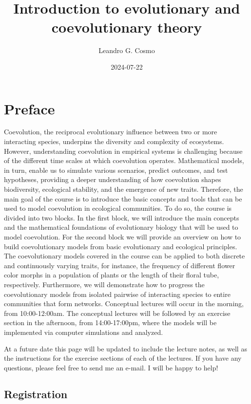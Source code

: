 \documentclass[
]{book}
\title{Introduction to evolutionary and coevolutionary theory}
\author{Leandro G. Cosmo}
\date{2024-07-22}
\begin{document}
\maketitle

{
\setcounter{tocdepth}{1}
\tableofcontents
}
\hypertarget{preface}{%
\chapter{Preface}\label{preface}}

Coevolution, the reciprocal evolutionary influence between two or more interacting species, underpins the diversity and complexity of ecosystems. However, understanding coevolution in empirical systems is challenging because of the different time scales at which coevolution operates. Mathematical models, in turn, enable us to simulate various scenarios, predict outcomes, and test hypotheses, providing a deeper understanding of how coevolution shapes biodiversity, ecological stability, and the emergence of new traits. Therefore, the main goal of the course is to introduce the basic concepts and tools that can be used to model coevolution in ecological communities. To do so, the course is divided into two blocks. In the first block, we will introduce the main concepts and the mathematical foundations of evolutionary biology that will be used to model coevolution. For the second block we will provide an overview on how to build coevolutionary models from basic evolutionary and ecological principles. The coevolutionary models covered in the course can be applied to both discrete and continuously varying traits, for instance, the frequency of different flower color morphs in a population of plants or the length of their floral tube, respectively. Furthermore, we will demonstrate how to progress the coevolutionary models from isolated pairwise of interacting species to entire communities that form networks. Conceptual lectures will occur in the morning, from 10:00-12:00am. The conceptual lectures will be followed by an exercise section in the afternoon, from 14:00-17:00pm, where the models will be implemented via computer simulations and analyzed.

At a future date this page will be updated to include the lecture notes, as well as the instructions for the exercise sections of each of the lectures. If you have any questions, please feel free to send me an e-mail. I will be happy to help!

\hypertarget{registration}{%
\section{Registration}\label{registration}}
\end{document}

